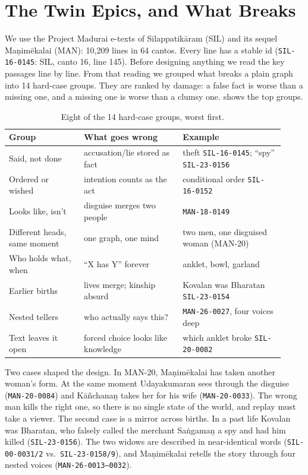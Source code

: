 \documentclass[11pt]{article}
\newcommand{\lid}[1]{\texttt{\small #1}}
\begin{document}
\section{The Twin Epics, and What Breaks}
\label{sec:data}

We use the Project Madurai e-texts of Silappatik\={a}ram (SIL) and its sequel Ma\d{n}im\={e}kalai (MAN): 10,209 lines in 64 cantos. Every line has a stable id (\lid{SIL-16-0145}: SIL, canto 16, line 145). Before designing anything we read the key passages line by line. From that reading we grouped what breaks a plain graph into 14 hard-case groups. They are ranked by damage: a false fact is worse than a missing one, and a missing one is worse than a clumsy one.  shows the top groups.

\begin{table}[t]
\centering\small
\setlength{\tabcolsep}{3pt}
\begin{tabular}{@{}p{0.25\linewidth}p{0.33\linewidth}p{0.34\linewidth}@{}}
\toprule
Group & What goes wrong & Example \\
\midrule
Said, not done & accusation/lie stored as fact & theft \lid{SIL-16-0145}; ``spy'' \lid{SIL-23-0156} \\
Ordered or wished & intention counts as the act & conditional order \lid{SIL-16-0152} \\
Looks like, isn't & disguise merges two people & \lid{MAN-18-0149} \\
Different heads, same moment & one graph, one mind & two men, one disguised woman (MAN-20) \\
Who holds what, when & ``X has Y'' forever & anklet, bowl, garland \\
Earlier births & lives merge; kinship absurd & Kovalan was Bharatan \lid{SIL-23-0154} \\
Nested tellers & who actually says this? & \lid{MAN-26-0027}, four voices deep \\
Text leaves it open & forced choice looks like knowledge & which anklet broke \lid{SIL-20-0082} \\
\bottomrule
\end{tabular}
\caption{Eight of the 14 hard-case groups, worst first.}
\label{tab:hard}
\end{table}

Two cases shaped the design. In MAN-20, Ma\d{n}im\={e}kalai has taken another woman's form. At the same moment Udayakumaran sees through the disguise (\lid{MAN-20-0084}) and K\={a}ñchana\b{n} takes her for his wife (\lid{MAN-20-0033}). The wrong man kills the right one, so there is no single state of the world, and replay must take a viewer. The second case is a mirror across births. In a past life Kovalan was Bharatan, who falsely called the merchant Sa\.{n}gama\b{n} a spy and had him killed (\lid{SIL-23-0156}). The two widows are described in near-identical words (\lid{SIL-00-0031/2} vs.\ \lid{SIL-23-0158/9}), and Ma\d{n}im\={e}kalai retells the story through four nested voices (\lid{MAN-26-0013--0032}).
\end{document}
